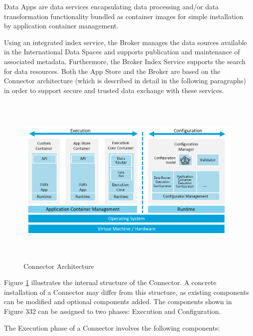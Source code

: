 Data Apps are data services encapsulating data processing and/or data transformation functionality bundled as container images for simple installation by application container management.

Using an integrated index service, the Broker manages the data sources available in the International Data Spaces and supports publication and maintenance of associated metadata. Furthermore, the Broker Index Service supports the search for data resources. Both the App Store and the Broker are based on the Connector architecture (which is described in detail in the following paragraphs) in order to support secure and trusted data exchange with these services.




\begin{figure}[H]
	\begin{Center}
		\includegraphics[width=6.37in,height=3.34in]{./media/image55.png}
		\caption{Connector Architecture}
		\label{fig:Connector_Architecture}
	\end{Center}
\end{figure}




Figure \ref{fig:Connector_Architecture} illustrates the internal structure of the Connector. A concrete installation of a Connector may differ from this structure, as existing components can be modified and optional components added. The components shown in Figure 332 can be assigned to two phases: Execution and Configuration.

The Execution phase of a Connector involves the following components:

